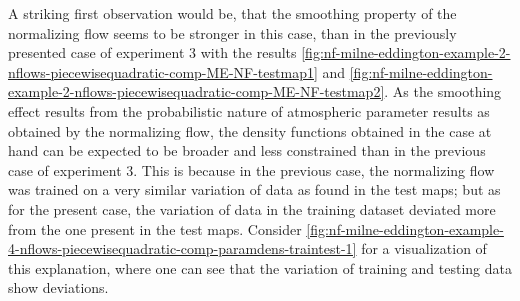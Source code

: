 \documentclass[a4paper,12pt]{report}
\begin{document}
A striking first observation would be, that the smoothing property of the normalizing flow seems to be stronger in this case, than in the previously presented case of experiment 3 with the results \cref{fig:nf-milne-eddington-example-2-nflows-piecewisequadratic-comp-ME-NF-testmap1} and \cref{fig:nf-milne-eddington-example-2-nflows-piecewisequadratic-comp-ME-NF-testmap2}. As the smoothing effect results from the probabilistic nature of atmospheric parameter results as obtained by the normalizing flow, the density functions obtained in the case at hand can be expected to be broader and less constrained than in the previous case of experiment 3. This is because in the previous case, the normalizing flow was trained on a very similar variation of data as found in the test maps; but as for the present case, the variation of data in the training dataset deviated more from the one present in the test maps. Consider \cref{fig:nf-milne-eddington-example-4-nflows-piecewisequadratic-comp-paramdens-traintest-1} for a visualization of this explanation, where one can see that the variation of training and testing data show deviations.
\end{document}
